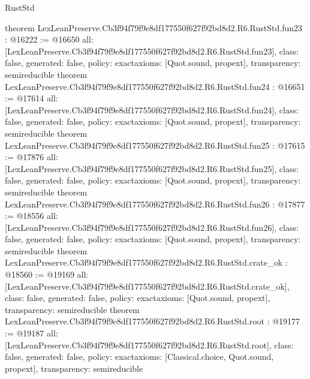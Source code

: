 \begin{lexlean}{RustStd}
\begin{coremodule}
{}
theorem LexLeanPreserve.Cb3f94f79f9e8df177550f627f92bd8d2.R6.RustStd.fun23 : @16222 := @16650 {
  all: [LexLeanPreserve.Cb3f94f79f9e8df177550f627f92bd8d2.R6.RustStd.fun23],
  class: false,
  generated: false,
  policy: exact{axioms: [Quot.sound, propext]},
  transparency: semireducible
}
theorem LexLeanPreserve.Cb3f94f79f9e8df177550f627f92bd8d2.R6.RustStd.fun24 : @16651 := @17614 {
  all: [LexLeanPreserve.Cb3f94f79f9e8df177550f627f92bd8d2.R6.RustStd.fun24],
  class: false,
  generated: false,
  policy: exact{axioms: [Quot.sound, propext]},
  transparency: semireducible
}
theorem LexLeanPreserve.Cb3f94f79f9e8df177550f627f92bd8d2.R6.RustStd.fun25 : @17615 := @17876 {
  all: [LexLeanPreserve.Cb3f94f79f9e8df177550f627f92bd8d2.R6.RustStd.fun25],
  class: false,
  generated: false,
  policy: exact{axioms: [Quot.sound, propext]},
  transparency: semireducible
}
theorem LexLeanPreserve.Cb3f94f79f9e8df177550f627f92bd8d2.R6.RustStd.fun26 : @17877 := @18556 {
  all: [LexLeanPreserve.Cb3f94f79f9e8df177550f627f92bd8d2.R6.RustStd.fun26],
  class: false,
  generated: false,
  policy: exact{axioms: [Quot.sound, propext]},
  transparency: semireducible
}
theorem LexLeanPreserve.Cb3f94f79f9e8df177550f627f92bd8d2.R6.RustStd.crate_ok : @18560 := @19169 {
  all: [LexLeanPreserve.Cb3f94f79f9e8df177550f627f92bd8d2.R6.RustStd.crate_ok],
  class: false,
  generated: false,
  policy: exact{axioms: [Quot.sound, propext]},
  transparency: semireducible
}
theorem LexLeanPreserve.Cb3f94f79f9e8df177550f627f92bd8d2.R6.RustStd.root : @19177 := @19187 {
  all: [LexLeanPreserve.Cb3f94f79f9e8df177550f627f92bd8d2.R6.RustStd.root],
  class: false,
  generated: false,
  policy: exact{axioms: [Classical.choice, Quot.sound, propext]},
  transparency: semireducible
}


\end{coremodule}
\end{lexlean}
